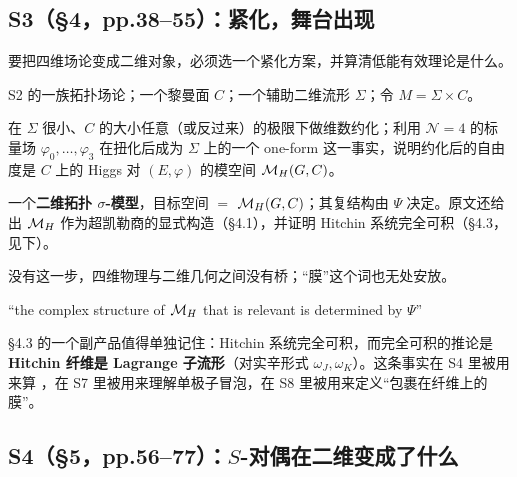 \subsection{S3（\S4，pp.38--55）：紧化，舞台出现}

\begin{description}[leftmargin=1.4em]
\item[要解决什么] 要把四维场论变成二维对象，必须选一个紧化方案，并算清低能有效理论是什么。
\item[输入] S2 的一族拓扑场论；一个黎曼面 $C$；一个辅助二维流形 $\Sigma$；令 $M=\Sigma\times C$。
\item[关键动作] 在 $\Sigma$ 很小、$C$ 的大小任意（或反过来）的极限下做维数约化；利用 $\mathcal{N}=4$ 的标量场 $\varphi_0,\dots,\varphi_3$ 在扭化后成为 $\Sigma$ 上的一个 one-form 这一事实，说明约化后的自由度是 $C$ 上的 Higgs 对 $(E,\varphi)$ 的模空间 $\mathcal{M}_H(G,C)$。
\item[产出] 一个\textbf{二维拓扑 $\sigma$-模型}，目标空间 $=$ $\mathcal{M}_H(G,C)$；其复结构由 $\Psi$ 决定。原文还给出 $\mathcal{M}_H$ 作为超凯勒商的显式构造（\S4.1），并证明 Hitchin 系统完全可积（\S4.3，见下）。
\item[为什么不可省] 没有这一步，四维物理与二维几何之间没有桥；“膜”这个词也无处安放。
\end{description}

\begin{origquote}
“the complex structure of $\mathcal{M}_H$ that is relevant is determined by $\Psi$” \pA
\end{origquote}

\S4.3 的一个副产品值得单独记住：Hitchin 系统完全可积，而完全可积的推论是\textbf{Hitchin 纤维是 Lagrange 子流形}（对实辛形式 $\omega_J,\omega_K$）\pA{}。这条事实在 S4 里被用来算 ，在 S7 里被用来理解单极子冒泡，在 S8 里被用来定义“包裹在纤维上的膜”。

\subsection{S4（\S5，pp.56--77）：$S$-对偶在二维变成了什么}

